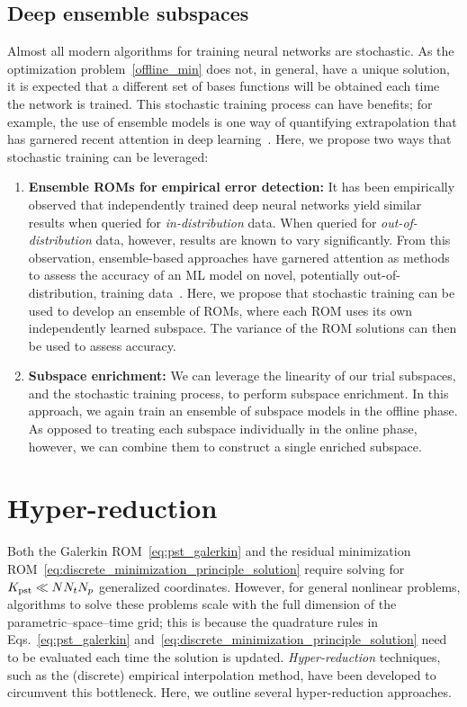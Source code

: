 \documentclass[3p,computermodern,10pt]{elsarticle}
\begin{document}
\subsection{Deep ensemble subspaces} 
Almost all modern algorithms for training neural networks are stochastic. As the optimization problem~\eqref{offline_min} does not, in general, have a unique solution, it is expected that a different set of bases functions will be obtained each time the network is trained. This stochastic training process can have benefits; for example, the use of ensemble models is one way of quantifying extrapolation that has garnered recent attention in deep learning~\cite{deep_ensembles}. Here, we propose two ways that stochastic training can be leveraged:
\begin{enumerate}
\item \textbf{Ensemble ROMs for empirical error detection:} It has been empirically observed that independently trained deep neural networks yield similar results when queried for \textit{in-distribution} data. When queried for \textit{out-of-distribution} data, however, results are known to vary significantly. From this observation, ensemble-based approaches have garnered attention as methods to assess the accuracy of an ML model on novel, potentially out-of-distribution, training data~\cite{deep_ensembles}. Here, we propose that stochastic training can be used to develop an ensemble of ROMs, where each ROM uses its own independently learned subspace. The variance of the ROM solutions can then be used to assess accuracy.   

\item \textbf{Subspace enrichment:} We can leverage the linearity of our trial subspaces, and the stochastic training process, to perform subspace enrichment. In this approach, we again train an ensemble of subspace models in the offline phase. As opposed to treating each subspace individually in the online phase, however, we can combine them to construct a single enriched subspace.
\end{enumerate}  


\section{Hyper-reduction}
Both the Galerkin ROM~\eqref{eq:pst_galerkin} and the residual minimization ROM~\eqref{eq:discrete_minimization_principle_solution} require solving for $K_{\text{pst}} \ll N N_t N_p$ generalized coordinates. However, for general nonlinear problems, algorithms to solve these problems scale with the full dimension of the parametric--space--time grid; this is because the quadrature rules in Eqs.~\eqref{eq:pst_galerkin} and~\eqref{eq:discrete_minimization_principle_solution} need to be evaluated each time the solution is updated. \textit{Hyper-reduction} techniques, such as the (discrete) empirical interpolation method, have been developed to circumvent this bottleneck. Here, we outline several hyper-reduction approaches.
\end{document}
